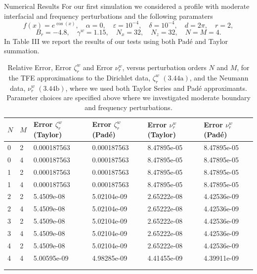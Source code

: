 \begin{section}{Numerical Results}
For our first simulation we considered a profile with moderate interfacial and frequency perturbations and the following paramaters 
$$f(x)=e^{\cos(x)},\quad \alpha = 0, \quad \varepsilon = 10^{-4}, \quad \delta = 10^{-4}, \quad d=2\pi,\quad r=2,$$
$$B_r=-4.8,\quad \gamma^w = 1.15, \quad N_x = 32,\quad N_z=32, \quad N=M=4.$$
In Table III we report the results of our tests using both Padé and Taylor summation.
\vspace{2mm}
\newpage
\label{First Numerical Tests Lower Layer}
\begin{longtable}[c]{llllll} \toprule
    {$N$} & {$M$} & {Error ${\zeta^w_r}$ (Taylor)} & {Error $\zeta^w_r$ (Padé)} & {Error $\nu^w_r$ (Taylor)} & {Error $\nu^w_r$ (Padé)}  \\ \midrule
0 & 2 & 0.000187563 & 0.000187563 & 8.47895e-05 & 8.47895e-05 \\
0 & 4 & 0.000187563 & 0.000187563 & 8.47895e-05 & 8.47895e-05 \\
1 & 2 & 0.000187563 & 0.000187563 & 8.47895e-05 & 8.47895e-05 \\
1 & 4 & 0.000187563 & 0.000187563 & 8.47895e-05 & 8.47895e-05 \\
2 & 2 & 5.4509e-08  & 5.02104e-09 & 2.65222e-08 & 4.42536e-09 \\
2 & 4 & 5.4509e-08  & 5.02104e-09 & 2.65222e-08 & 4.42536e-09 \\
3 & 2 & 5.4509e-08  & 5.02104e-09 & 2.65222e-08 & 4.42536e-09 \\
3 & 4 & 5.4509e-08  & 5.02104e-09 & 2.65222e-08 & 4.42536e-09 \\
4 & 2 & 5.4509e-08  & 5.02104e-09 & 2.65222e-08 & 4.42536e-09 \\
4 & 4 & 5.00595e-09 & 4.98285e-09 & 4.41455e-09 & 4.39911e-09 \\ \bottomrule
\\
\caption{Relative Error, Error ${\zeta^w_r}$ and Error $\nu^w_r$, versus perturbation orders $N$ and $M$, for the TFE approximations to the Dirichlet data, $\zeta^w_r$ $(3.44\text{a})$, and the Neumann data, $\nu^w_r$ $(3.44\text{b})$, where we used both Taylor Series and Padé approximants. Parameter choices are specified above where we investigated moderate boundary and frequency perturbations.}
\end{longtable}


\end{section}

